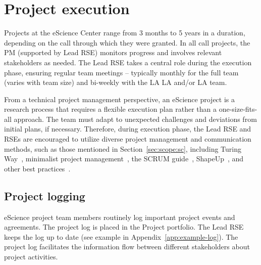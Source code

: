 \section{Project execution}
Projects at the eScience Center range from 3 months to 5 years in a duration, depending on the call through which they were
granted. In all call projects, the PM (supported by Lead RSE) monitors progress and involves relevant stakeholders as needed. 
The Lead RSE takes a central role during the execution phase, ensuring regular team meetings -- typically monthly for the full team (varies with team size) 
and bi-weekly with the LA LA and/or LA team.

From a technical project management perspective, an eScience project is a research process that requires a flexible execution plan rather than a one-size-fits-all approach.
The team must adapt to unexpected challenges and deviations from initial plans, if necessary. Therefore, 
during execution phase, the Lead RSE and RSEs are encouraged to utilize diverse project management and communication methods, 
such as those mentioned in Section~\ref{sec:scope:sc}, including Turing Way~\cite{the_turing_way-2023}, minimalist project management~\cite{microp3}, the SCRUM guide~\cite{scrum-guide}, ShapeUp~\cite{agilefirst2024shapeup}, and other best practices~\cite{beck2004xp,wilson2014best}.


\subsection{Project logging}
\label{sec:exec:log}
eScience project team members routinely log important project events and agreements. The project log is placed in the
Project portfolio. The Lead RSE keeps the log up to
date (see example in Appendix~\ref{app:example-log}). The project log facilitates the information flow between
different stakeholders about project activities.

